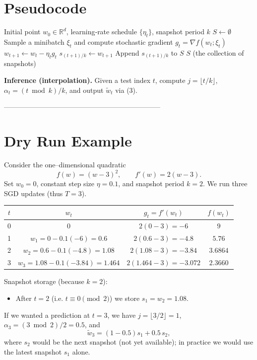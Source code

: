 \documentclass{article}
\newcommand{\R}{\mathbb{R}}
\begin{document}
\section*{Pseudocode}
\begin{algorithm}[H]
\caption{SWA-PS}
\begin{algorithmic}[1]
\REQUIRE Initial point $w_0\in\R^{d}$, learning‑rate schedule $\{\eta_t\}$, snapshot period $k$
\STATE $S\leftarrow\emptyset$ 
    \STATE Sample a minibatch $\xi_t$ and compute stochastic gradient $g_t=\nabla f(w_t;\xi_t)$
    \STATE $w_{t+1}\leftarrow w_t-\eta_t g_t$ \hfill{}
        \STATE $s_{(t+1)/k}\leftarrow w_{t+1}$ \hfill{}
        \STATE Append $s_{(t+1)/k}$ to $S$
    \ENDIF
\ENDFOR
\RETURN $S$ (the collection of snapshots)
\end{algorithmic}
\end{algorithm}

\noindent\textbf{Inference (interpolation).}  
Given a test index $t$, compute $j=\lfloor t/k\rfloor$, $\alpha_t=(t\bmod k)/k$, and output $\tilde w_t$ via (3).

--------------------------------------------------------------------

\section*{Dry Run Example}
Consider the one–dimensional quadratic
\[
f(w)=(w-3)^2,\qquad f'(w)=2(w-3).
\]
Set $w_0=0$, constant step size $\eta=0.1$, and snapshot period $k=2$.  
We run three SGD updates (thus $T=3$).

\begin{center}
\begin{tabular}{c|c|c|c}
$t$ & $w_t$ & $g_t= f'(w_t)$ & $f(w_t)$ \\ \hline
0 & $0$ & $2(0-3)=-6$ & $9$ \\
1 & $w_1 = 0-0.1(-6)=0.6$ & $2(0.6-3)=-4.8$ & $5.76$ \\
2 & $w_2 = 0.6-0.1(-4.8)=1.08$ & $2(1.08-3)=-3.84$ & $3.6864$ \\
3 & $w_3 = 1.08-0.1(-3.84)=1.464$ & $2(1.464-3)=-3.072$ & $2.3660$ \\
\end{tabular}
\end{center}

Snapshot storage (because $k=2$):
\begin{itemize}
\item After $t=2$ (i.e. $t\equiv0\pmod 2$) we store $s_1=w_2=1.08$.
\end{itemize}
If we wanted a prediction at $t=3$, we have $j=\lfloor3/2\rfloor=1$, $\alpha_3=(3\bmod2)/2=0.5$, and
\[
\tilde w_3=(1-0.5)s_1+0.5\,s_2,
\]
where $s_2$ would be the next snapshot (not yet available); in practice we would use the latest snapshot $s_1$ alone.
\end{document}
